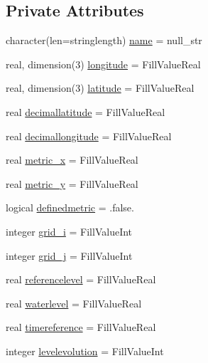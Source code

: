 \subsection*{Private Attributes}
\begin{DoxyCompactItemize}
\item 
character(len=stringlength) \mbox{\hyperlink{structmodulegauge_1_1t__tidegauge_a9ca2f02f6079d1e3dd72bb5fdcaf579c}{name}} = null\+\_\+str
\item 
real, dimension(3) \mbox{\hyperlink{structmodulegauge_1_1t__tidegauge_a29a2c236f340218e681fdfdafaf8e78d}{longitude}} = Fill\+Value\+Real
\item 
real, dimension(3) \mbox{\hyperlink{structmodulegauge_1_1t__tidegauge_a964ebf324c4c89cf6335bd44c59cba2d}{latitude}} = Fill\+Value\+Real
\item 
real \mbox{\hyperlink{structmodulegauge_1_1t__tidegauge_a45c10f24b11c67530b40c12d6e027388}{decimallatitude}} = Fill\+Value\+Real
\item 
real \mbox{\hyperlink{structmodulegauge_1_1t__tidegauge_a29e3852281eeaa3eacaa91c96dd59072}{decimallongitude}} = Fill\+Value\+Real
\item 
real \mbox{\hyperlink{structmodulegauge_1_1t__tidegauge_a20b5b39e4001e09ec04a4076f7087e06}{metric\+\_\+x}} = Fill\+Value\+Real
\item 
real \mbox{\hyperlink{structmodulegauge_1_1t__tidegauge_a3ebaeac9720a430c6a696cc2e302214f}{metric\+\_\+y}} = Fill\+Value\+Real
\item 
logical \mbox{\hyperlink{structmodulegauge_1_1t__tidegauge_afd3308749cda3ff69097f0c05ef25e2e}{definedmetric}} = .false.
\item 
integer \mbox{\hyperlink{structmodulegauge_1_1t__tidegauge_a08835098e2f827903949df9335dd4a70}{grid\+\_\+i}} = Fill\+Value\+Int
\item 
integer \mbox{\hyperlink{structmodulegauge_1_1t__tidegauge_aae49b5806d2243a6b86ad685d84e7e35}{grid\+\_\+j}} = Fill\+Value\+Int
\item 
real \mbox{\hyperlink{structmodulegauge_1_1t__tidegauge_a7a96642ae2bf83fba28d35abeb45c0f6}{referencelevel}} = Fill\+Value\+Real
\item 
real \mbox{\hyperlink{structmodulegauge_1_1t__tidegauge_ad0d0eca0e95c01f11710d04a93b16bac}{waterlevel}} = Fill\+Value\+Real
\item 
real \mbox{\hyperlink{structmodulegauge_1_1t__tidegauge_a443c8ec715ca3d74563e29f686a25cbb}{timereference}} = Fill\+Value\+Real
\item 
integer \mbox{\hyperlink{structmodulegauge_1_1t__tidegauge_afedb89508182ced13491320314e0ad2d}{levelevolution}} = Fill\+Value\+Int

\end{DoxyCompactItemize}
